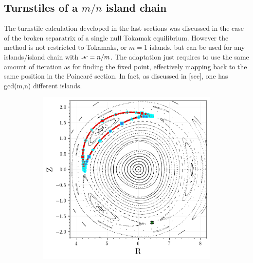\subsection{Turnstiles of a $m/n$ island chain}

The turnstile calculation developed in the last sections was discussed in the case of the broken separatrix of a single null Tokamak equilibrium. However the method is not restricted to Tokamaks, or $m=1$ islands, but can be used for any islands/island chain with $\iotaslash = n/m$. The adaptation just requires to use the same amount of iteration as for finding the fixed point, effectively mapping back to the same position in the Poincaré section. In fact, as discussed in [sec], one has gcd(m,n) different islands.

\begin{figure}[h!]
    \centering
    \begin{subfigure}[c]{0.49\textwidth}
        \centering
        \includegraphics[width=\textwidth]{images/high-aspect-ratio/heteroclinics_outer_3.png}
        \caption{}
    \end{subfigure}
    \hfill
    \begin{subfigure}[c]{0.49\textwidth}
        \centering

\end{subfigure}
\end{figure}

